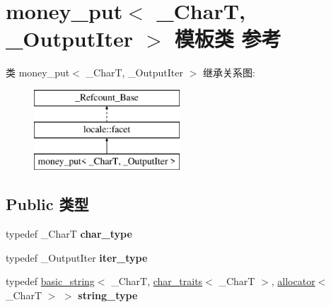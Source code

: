 \hypertarget{classmoney__put}{}\section{money\+\_\+put$<$ \+\_\+\+CharT, \+\_\+\+Output\+Iter $>$ 模板类 参考}
\label{classmoney__put}
类 money\+\_\+put$<$ \+\_\+\+CharT, \+\_\+\+Output\+Iter $>$ 继承关系图\+:\begin{figure}[H]
\begin{center}
\leavevmode
\includegraphics[height=3.000000cm]{classmoney__put}
\end{center}
\end{figure}
\subsection*{Public 类型}
\begin{DoxyCompactItemize}
\item 
\mbox{\label{classmoney__put_a48b4e0fe33c623a20b0d9c8a768adcc3}} 
typedef \+\_\+\+CharT {\bfseries char\+\_\+type}
\item 
\mbox{\label{classmoney__put_a1a22ac3dfc60d56fb68fc485ce6b0eb0}} 
typedef \+\_\+\+Output\+Iter {\bfseries iter\+\_\+type}
\item 
\mbox{\label{classmoney__put_a68b878815c01ec4b3d1a76fa67eceba4}} 
typedef \hyperlink{classbasic__string}{basic\+\_\+string}$<$ \+\_\+\+CharT, \hyperlink{classchar__traits}{char\+\_\+traits}$<$ \+\_\+\+CharT $>$, \hyperlink{classallocator}{allocator}$<$ \+\_\+\+CharT $>$ $>$ {\bfseries string\+\_\+type}
\end{DoxyCompactItemize}

